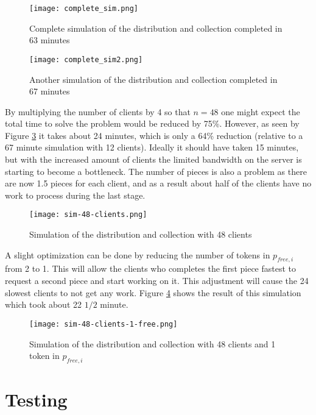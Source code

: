 \begin{figure}[htbp]
	\centering 
	\texttt{[image: complete\_sim.png]}
	\caption{Complete simulation of the distribution and collection completed in 63 minutes}
	\label{fig:complete_sim}
\end{figure}

\begin{figure}[htbp]
	\centering 
	\texttt{[image: complete\_sim2.png]}
	\caption{Another simulation of the distribution and collection completed in 67 minutes}
	\label{fig:complete_sim2}
\end{figure}

By multiplying the number of clients by 4 so that $n = 48$ one might expect the total time to solve the problem would be reduced by 75\%.
However, as seen by Figure \ref{fig:sim-48clients} it takes about 24 minutes, which is only a 64\% reduction (relative to a 67 minute simulation with 12 clients).
Ideally it should have taken 15 minutes, but with the increased amount of clients the limited bandwidth on the server is starting to become a bottleneck.
The number of pieces is also a problem as there are now 1.5 pieces for each client, and as a result about half of the clients have no work to process during the last stage.

\begin{figure}[tbp]
	\centering 
	\texttt{[image: sim-48-clients.png]}
	\caption{Simulation of the distribution and collection with 48 clients}
	\label{fig:sim-48clients}
\end{figure}

A slight optimization can be done by reducing the number of tokens in $p_{free,i}$ from 2 to 1.
This will allow the clients who completes the first piece fastest to request a second piece and start working on it.
This adjustment will cause the 24 slowest clients to not get any work.
Figure \ref{fig:sim-48clients-1free} shows the result of this simulation which took about 22 $1/2$ minute.

\begin{figure}[tbp]
	\centering 
	\texttt{[image: sim-48-clients-1-free.png]}
	\caption{Simulation of the distribution and collection with 48 clients and 1 token in $p_{free,i}$}
	\label{fig:sim-48clients-1free}
\end{figure}



\section{Testing}

